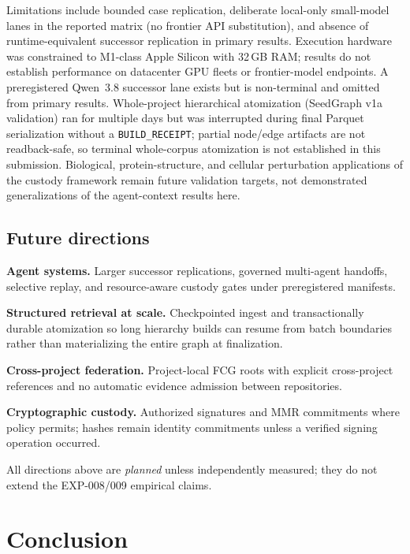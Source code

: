 \documentclass{article}
\begin{document}
Limitations include bounded case replication, deliberate local-only small-model lanes in the reported matrix (no frontier API substitution), and absence of runtime-equivalent successor replication in primary results.
Execution hardware was constrained to M1-class Apple Silicon with 32\,GB RAM; results do not establish performance on datacenter GPU fleets or frontier-model endpoints.
A preregistered Qwen~3.8 successor lane exists but is non-terminal and omitted from primary results.
Whole-project hierarchical atomization (SeedGraph v1a validation) ran for multiple days but was interrupted during final Parquet serialization without a \texttt{BUILD\_RECEIPT}; partial node/edge artifacts are not readback-safe, so terminal whole-corpus atomization is not established in this submission.
Biological, protein-structure, and cellular perturbation applications of the custody framework remain future validation targets, not demonstrated generalizations of the agent-context results here.

\subsection{Future directions}

\textbf{Agent systems.} Larger successor replications, governed multi-agent handoffs, selective replay, and resource-aware custody gates under preregistered manifests.

\textbf{Structured retrieval at scale.} Checkpointed ingest and transactionally durable atomization so long hierarchy builds can resume from batch boundaries rather than materializing the entire graph at finalization.

\textbf{Cross-project federation.} Project-local FCG roots with explicit cross-project references and no automatic evidence admission between repositories.

\textbf{Cryptographic custody.} Authorized signatures and MMR commitments where policy permits; hashes remain identity commitments unless a verified signing operation occurred.

All directions above are \emph{planned} unless independently measured; they do not extend the EXP-008/009 empirical claims.

\section{Conclusion}
\end{document}
